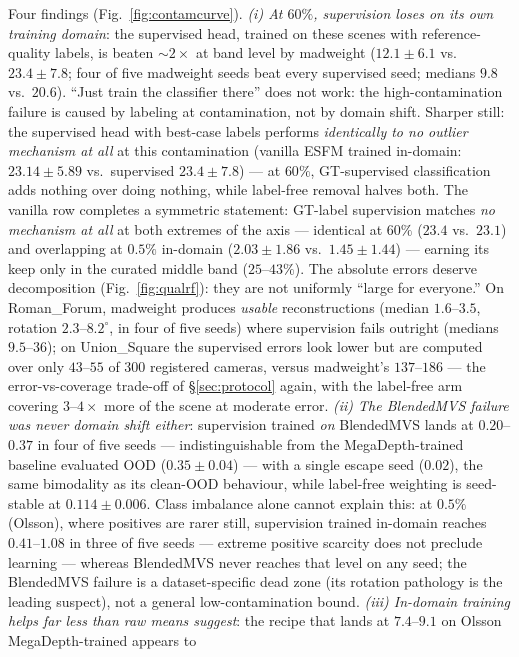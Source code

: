 \documentclass{article}
\newcommand{\mad}{madweight}
\renewcommand{\deg}{^{\circ}}
\begin{document}
Four findings (Fig.~\ref{fig:contamcurve}). \emph{(i) At $60\%$, supervision loses on its own training domain}: the
supervised head, trained on these scenes with reference-quality labels, is beaten
$\sim\!2\times$ at band level by \mad{} ($12.1\pm6.1$ vs.\ $23.4\pm7.8$; four of five
\mad{} seeds beat every supervised seed; medians $9.8$ vs.\ $20.6$). ``Just train the
classifier there'' does not work: the high-contamination failure is caused by labeling at
contamination, not by domain shift. Sharper still: the supervised head with best-case labels performs
\emph{identically to no outlier mechanism at all} at this contamination (vanilla ESFM
trained in-domain: $23.14\pm5.89$ vs.\ supervised $23.4\pm7.8$) --- at $60\%$,
GT-supervised classification adds nothing over doing nothing, while label-free removal
halves both. The vanilla row completes a symmetric statement: GT-label supervision
matches \emph{no mechanism at all} at both extremes of the axis --- identical at
$60\%$ ($23.4$ vs.\ $23.1$) and overlapping at $0.5\%$ in-domain ($2.03\pm1.86$
vs.\ $1.45\pm1.44$) --- earning its keep only in the curated middle band
($25$--$43\%$). The absolute errors deserve decomposition (Fig.~\ref{fig:qualrf}): they are
not uniformly ``large for everyone.'' On Roman\_Forum, \mad{} produces \emph{usable}
reconstructions (median $1.6$--$3.5$, rotation $2.3$--$8.2\deg$, in four of five seeds)
where supervision fails outright (medians $9.5$--$36$); on Union\_Square the supervised
errors look lower but are computed over only $43$--$55$ of $300$ registered cameras,
versus \mad{}'s $137$--$186$ --- the error-vs-coverage trade-off of
\S\ref{sec:protocol} again, with the label-free arm covering $3$--$4\times$ more of
the scene at moderate error. \emph{(ii) The BlendedMVS failure was never domain
shift either}: supervision trained \emph{on} BlendedMVS lands at $0.20$--$0.37$ in four
of five seeds --- indistinguishable from the MegaDepth-trained baseline evaluated OOD
($0.35\pm0.04$) --- with a single escape seed ($0.02$), the same bimodality as its
clean-OOD behaviour, while label-free weighting is seed-stable at $0.114\pm0.006$.
Class imbalance alone cannot explain this: at $0.5\%$ (Olsson), where positives are
rarer still, supervision trained in-domain reaches $0.41$--$1.08$ in three of five
seeds --- extreme positive scarcity does not preclude learning --- whereas BlendedMVS
never reaches that level on any seed; the BlendedMVS failure is a dataset-specific
dead zone (its rotation pathology is the leading suspect), not a general
low-contamination bound. \emph{(iii) In-domain training helps far less than raw means
suggest}: the recipe that lands at $7.4$--$9.1$ on Olsson MegaDepth-trained appears to
\end{document}
